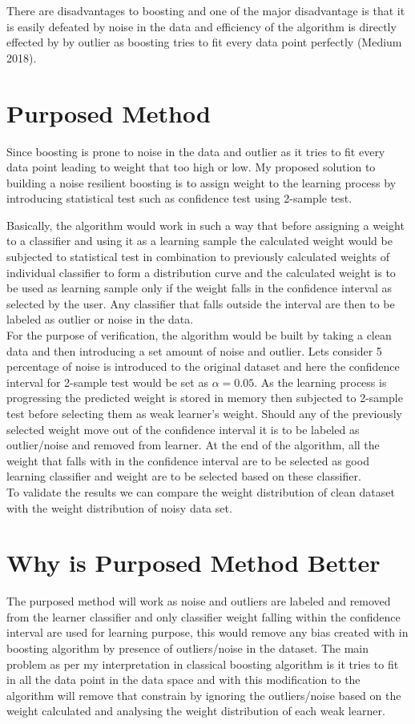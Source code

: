 \documentclass{article}
\begin{document}
There are disadvantages to boosting and one of the major disadvantage is that it is easily defeated by noise in the data and efficiency of the algorithm is directly effected by by outlier as boosting tries to fit every data point perfectly (Medium 2018).

\section{Purposed Method}
Since boosting is prone to noise in the data and outlier as it tries to fit every data point leading to weight that too high or low. My proposed solution to building a noise resilient boosting is to assign weight to the learning process by introducing statistical test such as confidence test using 2-sample test.

Basically, the algorithm would work in such a way that before assigning a weight to a classifier and using it as a learning sample the calculated weight would be subjected to statistical test in combination to previously calculated weights of individual classifier to form a distribution curve and the calculated weight is to be used as learning sample only if the weight falls in the confidence interval as selected by the user. Any classifier that falls outside the interval are then to be labeled as outlier or noise in the data.\\ 
For the purpose of verification, the algorithm would be built by taking a clean data and then introducing a set amount of noise and outlier. Lets consider 5 percentage of noise is introduced to the original dataset and here the confidence interval for 2-sample test would be set as ${\alpha = 0.05}$. As the learning process is progressing the predicted weight is stored in memory then subjected to 2-sample test before selecting them as weak learner's weight. Should any of the previously selected weight move out of the confidence interval it is to be labeled as outlier/noise and removed from learner. At the end of the algorithm, all the weight that falls with in the confidence interval are to be selected as good learning classifier and weight are to be selected based on these classifier. \\

To validate the results we can compare the weight distribution of clean dataset with the weight distribution of noisy data set. 

        
\section{Why is Purposed Method Better}\label{conclusion}
The purposed method will work as noise and outliers are labeled and removed from the learner classifier and only classifier weight falling within the confidence interval are used for learning purpose, this would remove any bias created with in boosting algorithm by presence of outliers/noise in the dataset. The main problem as per my interpretation in classical boosting algorithm is it tries to fit in all the data point in the data space and with this modification to the algorithm will remove that constrain by ignoring the outliers/noise based on the weight calculated and analysing the weight distribution of each weak learner. 
\pagebreak
\end{document}
